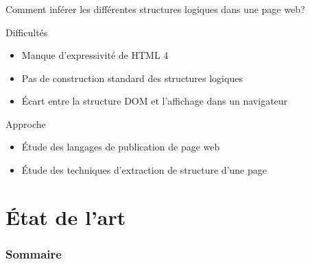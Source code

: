 \documentclass[9pt]{beamer}
\begin{document}
\begin{frame}
	\frametitle{}
	\begin{block}{}
	Comment inférer les différentes structures logiques dans une page web?
	\end{block}
	\begin{block}{Difficultés}
		\begin{itemize}
			\item Manque d'expressivité de HTML 4
			\item Pas de construction standard des structures logiques
			\item Écart entre la structure DOM et l'affichage dans un navigateur
		\end{itemize}
	\end{block}
	\begin{block}{Approche}
		\begin{itemize}
			\item Étude des langages de publication de page web
			\item Étude des techniques d'extraction de structure d'une page
		\end{itemize}
	\end{block}
\end{frame}


\section{État de l'art}

\begin{frame}
  \frametitle{Sommaire}
\end{frame}
\end{document}
